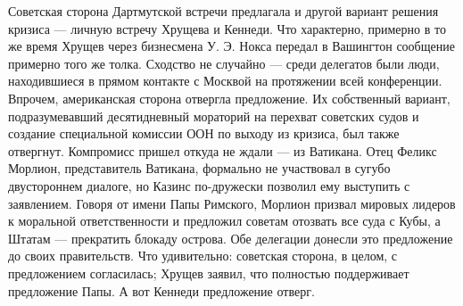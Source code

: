 Советская сторона Дартмутской встречи предлагала и другой вариант решения кризиса — личную встречу Хрущева и Кеннеди. Что характерно, примерно в то же время Хрущев через бизнесмена У. Э. Нокса передал в Вашингтон сообщение примерно того же толка. Сходство не случайно — среди делегатов были люди, находившиеся в прямом контакте с Москвой на протяжении всей конференции. Впрочем, американская сторона отвергла предложение. Их собственный вариант, подразумевавший десятидневный мораторий на перехват советских судов и создание специальной комиссии ООН по выходу из кризиса, был также отвергнут. Компромисс пришел откуда не ждали — из Ватикана. Отец Феликс Морлион, представитель Ватикана, формально не участвовал в сугубо двустороннем диалоге, но Казинс по-дружески позволил ему выступить с заявлением. Говоря от имени Папы Римского, Морлион призвал мировых лидеров к моральной ответственности и предложил советам отозвать все суда с Кубы, а Штатам — прекратить блокаду острова. Обе делегации донесли это предложение до своих правительств. Что удивительно: советская сторона, в целом, с предложением согласилась; Хрущев заявил, что полностью поддерживает предложение Папы. А вот Кеннеди предложение отверг.
